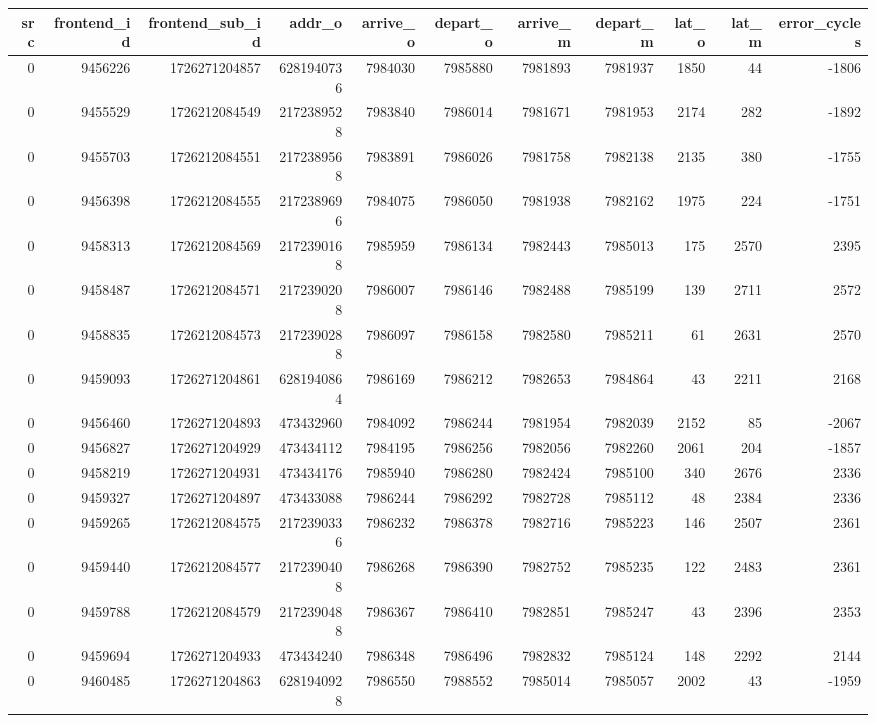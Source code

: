 \begin{tabular}{rrrrrrrrrrr}
\toprule
src & frontend\_id & frontend\_sub\_id & addr\_o & arrive\_o & depart\_o & arrive\_m & depart\_m & lat\_o & lat\_m & error\_cycles \\
\midrule
0 & 9456226 & 1726271204857 & 6281940736 & 7984030 & 7985880 & 7981893 & 7981937 & 1850 & 44 & -1806 \\
0 & 9455529 & 1726212084549 & 2172389528 & 7983840 & 7986014 & 7981671 & 7981953 & 2174 & 282 & -1892 \\
0 & 9455703 & 1726212084551 & 2172389568 & 7983891 & 7986026 & 7981758 & 7982138 & 2135 & 380 & -1755 \\
0 & 9456398 & 1726212084555 & 2172389696 & 7984075 & 7986050 & 7981938 & 7982162 & 1975 & 224 & -1751 \\
0 & 9458313 & 1726212084569 & 2172390168 & 7985959 & 7986134 & 7982443 & 7985013 & 175 & 2570 & 2395 \\
0 & 9458487 & 1726212084571 & 2172390208 & 7986007 & 7986146 & 7982488 & 7985199 & 139 & 2711 & 2572 \\
0 & 9458835 & 1726212084573 & 2172390288 & 7986097 & 7986158 & 7982580 & 7985211 & 61 & 2631 & 2570 \\
0 & 9459093 & 1726271204861 & 6281940864 & 7986169 & 7986212 & 7982653 & 7984864 & 43 & 2211 & 2168 \\
0 & 9456460 & 1726271204893 & 473432960 & 7984092 & 7986244 & 7981954 & 7982039 & 2152 & 85 & -2067 \\
0 & 9456827 & 1726271204929 & 473434112 & 7984195 & 7986256 & 7982056 & 7982260 & 2061 & 204 & -1857 \\
0 & 9458219 & 1726271204931 & 473434176 & 7985940 & 7986280 & 7982424 & 7985100 & 340 & 2676 & 2336 \\
0 & 9459327 & 1726271204897 & 473433088 & 7986244 & 7986292 & 7982728 & 7985112 & 48 & 2384 & 2336 \\
0 & 9459265 & 1726212084575 & 2172390336 & 7986232 & 7986378 & 7982716 & 7985223 & 146 & 2507 & 2361 \\
0 & 9459440 & 1726212084577 & 2172390408 & 7986268 & 7986390 & 7982752 & 7985235 & 122 & 2483 & 2361 \\
0 & 9459788 & 1726212084579 & 2172390488 & 7986367 & 7986410 & 7982851 & 7985247 & 43 & 2396 & 2353 \\
0 & 9459694 & 1726271204933 & 473434240 & 7986348 & 7986496 & 7982832 & 7985124 & 148 & 2292 & 2144 \\
0 & 9460485 & 1726271204863 & 6281940928 & 7986550 & 7988552 & 7985014 & 7985057 & 2002 & 43 & -1959 \\

\end{tabular}
